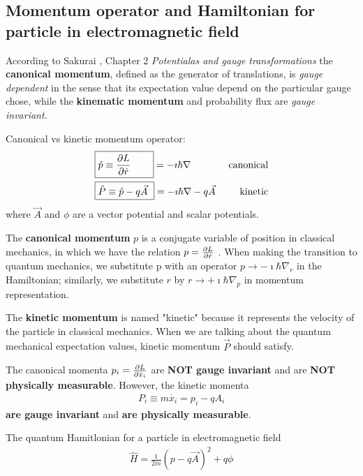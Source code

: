 \documentclass[11pt]{article}
\begin{document}
\subsection{Momentum operator and Hamiltonian for particle in electromagnetic field}

According  to Sakurai \cite{Sakurai-2nd_ed}, Chapter 2 \emph{Potentialas and gauge transformations}  the  {\bf canonical momentum}, defined as  the generator of translations, is \emph{gauge dependent} in the sense that its expectation value depend on the particular gauge chose, while the  {\bf kinematic momentum}  and probability flux are  \emph{gauge invariant}.

 
Canonical vs kinetic momentum operator:
\begin{align*}
    &\boxed{\hat p \equiv \pdv{L}{\dot r} \qquad} =-\imath  \hbar \nabla    & \text{  canonical}  \\
    &\boxed{ \hat P \equiv  \hat p - q \Vec{A} \ }=-\imath  \hbar \nabla -q \vec A & \mbox{ kinetic}
\end{align*}
where $\vec A$ and $\phi$  are  a vector potential and scalar potentials.

The {\bf canonical momentum} $p$ is a conjugate variable of position in classical mechanics, in which we have the relation 
$p=\pdv{L}{\dot r}$
. When making the transition to quantum mechanics, we substitute p
 with an operator $p \to -\imath \hbar \nabla_r$
 in the Hamiltonian; similarly, we substitute $r$  by $r \to +\imath \hbar \nabla_p$  in momentum representation.

The {\bf kinetic momentum} is named "kinetic" because it represents the velocity of the particle in classical mechanics. When we are talking about the quantum mechanical expectation values, kinetic momentum $\vec P$   should satisfy.


The canonical momenta $p_i=\pdv{L}{\dot x_i}$ are {\bf NOT gauge invariant} and are {\bf NOT physically measurable}.  However, the kinetic momenta 
\begin{align*}
    P_i \equiv m\dot{x_i} = p_i - q A_i      
\end{align*}
{\bf are gauge invariant} and  {\bf are physically measurable}.


 The quantum  Hamitlonian for a particle in electromagnetic field  
\begin{align}\boxed{
\hat H =  \frac{1}{2m}  (p - q \vec A)^2  + q\phi}
\label{eq:H_EM}
\end{align}
\end{document}
